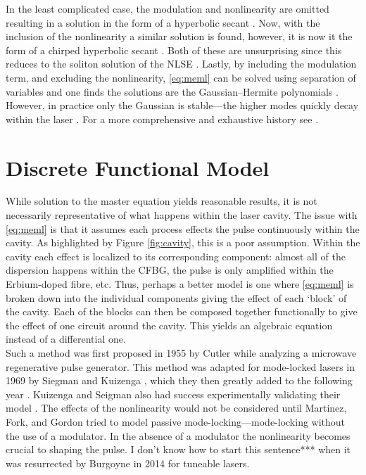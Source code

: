 In the least complicated case, the modulation and nonlinearity are omitted resulting in a solution in the form of a hyperbolic secant \cite{haus1975, haus1986, haus1992}. Now, with the inclusion of the nonlinearity a similar solution is found, however, it is now it the form of a chirped hyperbolic secant \cite{haus1991, usechak}. Both of these are unsurprising since this reduces to the soliton solution of the NLSE \cite{ferreira}. Lastly, by including the modulation term, and excluding the nonlinearity, \eqref{eq:meml} can be solved using separation of variables and one finds the solutions are the Gaussian--Hermite polynomials \cite{burgoyne2014, hausbook, haus1975, haus1996, haus2000, kartner, tamura, usechak}. However, in practice only the Gaussian is stable---the higher modes quickly decay within the laser \cite{hausbook, haus1975, haus1996, haus2000}. For a more comprehensive and exhaustive history see \cite{haus2000}. \\

\section{Discrete Functional Model}
While solution to the master equation yields reasonable results, it is not necessarily representative of what happens within the laser cavity. The issue with \eqref{eq:meml} is that it assumes each process effects the pulse continuously within the cavity. As highlighted by Figure \ref{fig:cavity}, this is a poor assumption. Within the cavity each effect is localized to its corresponding component: almost all of the dispersion happens within the CFBG, the pulse is only amplified within the Erbium-doped fibre, etc. Thus, perhaps a better model is one where \eqref{eq:meml} is broken down into the individual components giving the effect of each `block' of the cavity. Each of the blocks can then be composed together functionally to give the effect of one circuit around the cavity. This yields an algebraic equation instead of a differential one. \\

Such a method was first proposed in 1955 by Cutler \cite{cutler} while analyzing a microwave regenerative pulse generator. This method was adapted for mode-locked lasers in 1969 by Siegman and Kuizenga \cite{siegman}, which they then greatly added to the following year \cite{kuizenga1970a}. Kuizenga and Seigman also had success experimentally validating their model \cite{kuizenga1970b, kuizenga1970}. The effects of the nonlinearity would not be considered until Martinez, Fork, and Gordon \cite{martinez1984, martinez1985} tried to model passive mode-locking---mode-locking without the use of a modulator. In the absence of a modulator the nonlinearity becomes crucial to shaping the pulse. I don't know how to start this sentence*** when it was resurrected by Burgoyne \cite{burgoyne2014} in 2014 for tuneable lasers. \\

